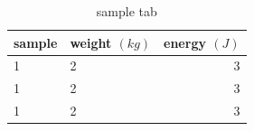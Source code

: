 \begin{table}[b]
    \centering
    \begin{tabular}{llr}
        \hline
        sample & weight $(kg)$ & energy $(J)$ \\
        \hline
        1      & 2             & 3            \\
        1      & 2             & 3            \\
        1      & 2             & 3            \\
        \hline
    \end{tabular}
    \caption{sample tab}
    \label{tab:sampletab}

\end{table}
